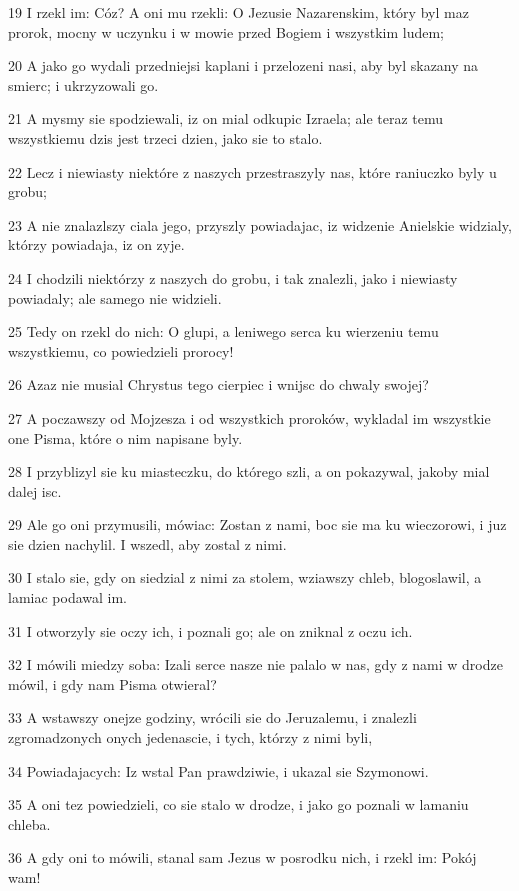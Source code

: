 \par 19 I rzekl im: Cóz? A oni mu rzekli: O Jezusie Nazarenskim, który byl maz prorok, mocny w uczynku i w mowie przed Bogiem i wszystkim ludem;
\par 20 A jako go wydali przedniejsi kaplani i przelozeni nasi, aby byl skazany na smierc; i ukrzyzowali go.
\par 21 A mysmy sie spodziewali, iz on mial odkupic Izraela; ale teraz temu wszystkiemu dzis jest trzeci dzien, jako sie to stalo.
\par 22 Lecz i niewiasty niektóre z naszych przestraszyly nas, które raniuczko byly u grobu;
\par 23 A nie znalazlszy ciala jego, przyszly powiadajac, iz widzenie Anielskie widzialy, którzy powiadaja, iz on zyje.
\par 24 I chodzili niektórzy z naszych do grobu, i tak znalezli, jako i niewiasty powiadaly; ale samego nie widzieli.
\par 25 Tedy on rzekl do nich: O glupi, a leniwego serca ku wierzeniu temu wszystkiemu, co powiedzieli prorocy!
\par 26 Azaz nie musial Chrystus tego cierpiec i wnijsc do chwaly swojej?
\par 27 A poczawszy od Mojzesza i od wszystkich proroków, wykladal im wszystkie one Pisma, które o nim napisane byly.
\par 28 I przyblizyl sie ku miasteczku, do którego szli, a on pokazywal, jakoby mial dalej isc.
\par 29 Ale go oni przymusili, mówiac: Zostan z nami, boc sie ma ku wieczorowi, i juz sie dzien nachylil. I wszedl, aby zostal z nimi.
\par 30 I stalo sie, gdy on siedzial z nimi za stolem, wziawszy chleb, blogoslawil, a lamiac podawal im.
\par 31 I otworzyly sie oczy ich, i poznali go; ale on zniknal z oczu ich.
\par 32 I mówili miedzy soba: Izali serce nasze nie palalo w nas, gdy z nami w drodze mówil, i gdy nam Pisma otwieral?
\par 33 A wstawszy onejze godziny, wrócili sie do Jeruzalemu, i znalezli zgromadzonych onych jedenascie, i tych, którzy z nimi byli,
\par 34 Powiadajacych: Iz wstal Pan prawdziwie, i ukazal sie Szymonowi.
\par 35 A oni tez powiedzieli, co sie stalo w drodze, i jako go poznali w lamaniu chleba.
\par 36 A gdy oni to mówili, stanal sam Jezus w posrodku nich, i rzekl im: Pokój wam!
